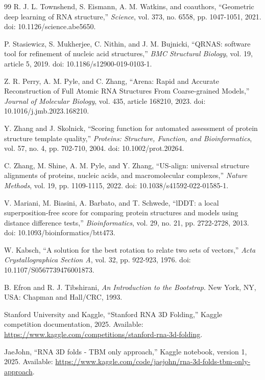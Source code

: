 \begin{thebibliography}{99}
R. J. L. Townshend, S. Eismann, A. M. Watkins, and coauthors,
``Geometric deep learning of RNA structure,''
\emph{Science}, vol. 373, no. 6558, pp. 1047-1051, 2021.
doi: 10.1126/science.abe5650.

P. Stasiewicz, S. Mukherjee, C. Nithin, and J. M. Bujnicki,
``QRNAS: software tool for refinement of nucleic acid structures,''
\emph{BMC Structural Biology}, vol. 19, article 5, 2019.
doi: 10.1186/s12900-019-0103-1.

Z. R. Perry, A. M. Pyle, and C. Zhang,
``Arena: Rapid and Accurate Reconstruction of Full Atomic RNA Structures From Coarse-grained Models,''
\emph{Journal of Molecular Biology}, vol. 435, article 168210, 2023.
doi: 10.1016/j.jmb.2023.168210.

Y. Zhang and J. Skolnick,
``Scoring function for automated assessment of protein structure template quality,''
\emph{Proteins: Structure, Function, and Bioinformatics}, vol. 57, no. 4, pp. 702-710, 2004.
doi: 10.1002/prot.20264.

C. Zhang, M. Shine, A. M. Pyle, and Y. Zhang,
``US-align: universal structure alignments of proteins, nucleic acids, and macromolecular complexes,''
\emph{Nature Methods}, vol. 19, pp. 1109-1115, 2022.
doi: 10.1038/s41592-022-01585-1.

V. Mariani, M. Biasini, A. Barbato, and T. Schwede,
``lDDT: a local superposition-free score for comparing protein structures and models using distance difference tests,''
\emph{Bioinformatics}, vol. 29, no. 21, pp. 2722-2728, 2013.
doi: 10.1093/bioinformatics/btt473.

W. Kabsch,
``A solution for the best rotation to relate two sets of vectors,''
\emph{Acta Crystallographica Section A}, vol. 32, pp. 922-923, 1976.
doi: 10.1107/S0567739476001873.

B. Efron and R. J. Tibshirani,
\emph{An Introduction to the Bootstrap}.
New York, NY, USA: Chapman and Hall/CRC, 1993.

Stanford University and Kaggle,
``Stanford RNA 3D Folding,''
Kaggle competition documentation, 2025.
Available: \url{https://www.kaggle.com/competitions/stanford-rna-3d-folding}.

JaeJohn,
``RNA 3D folds - TBM only approach,''
Kaggle notebook, version 1, 2025.
Available: \url{https://www.kaggle.com/code/jaejohn/rna-3d-folds-tbm-only-approach}.

\end{thebibliography}
